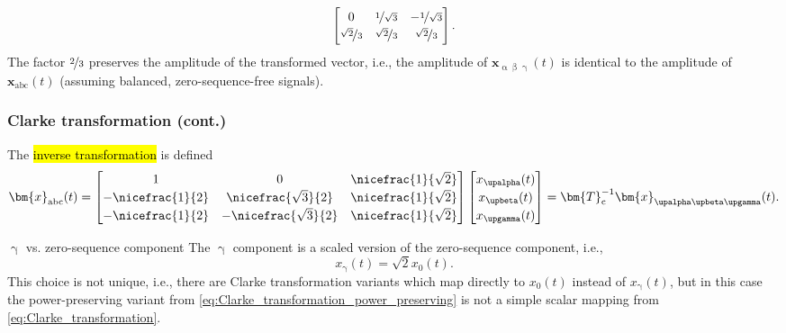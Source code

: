 \begin{frame}
\begin{equation}
\begin{bmatrix}
            0                      & \nicefrac{1}{\sqrt{3}} & -\nicefrac{1}{\sqrt{3}} \\
            \nicefrac{\sqrt{2}}{3} & \nicefrac{\sqrt{2}}{3} & \nicefrac{\sqrt{2}}{3}
        \end{bmatrix}.
    \end{equation}\pause
    The factor $\nicefrac{2}{3}$ preserves the amplitude of the transformed vector, i.e., the amplitude of $\bm{x}_\mathrm{\upalpha \upbeta \upgamma}(t)$ is identical to the amplitude of $\bm{x}_\mathrm{abc}(t)$ (assuming balanced,  zero-sequence-free signals).
\end{frame}

\begin{frame}
    \frametitle{Clarke transformation (cont.)}
    The \hl{inverse transformation} is defined
    \begin{equation}
        \renewcommand{\arraystretch}{1.2}
        \bm{x}_\mathrm{abc}(t)  = \begin{bmatrix}
            1                & 0                       & \nicefrac{1}{\sqrt{2}} \\
            -\nicefrac{1}{2} & \nicefrac{\sqrt{3}}{2}  & \nicefrac{1}{\sqrt{2}} \\
            -\nicefrac{1}{2} & -\nicefrac{\sqrt{3}}{2} & \nicefrac{1}{\sqrt{2}}
        \end{bmatrix} \begin{bmatrix} x_\upalpha(t) \\ x_\upbeta(t) \\ x_\upgamma(t)\end{bmatrix} = \bm{T}_\mathrm{c}^{-1} \bm{x}_{\upalpha \upbeta \upgamma}(t).
    \end{equation}\pause
    \begin{varblock}{$\upgamma$ vs. zero-sequence component}
        The $\upgamma$ component is a scaled version of the zero-sequence component, i.e., $$x_\upgamma(t) = \sqrt{2} x_0(t).$$
        This choice is not unique, i.e., there are Clarke transformation variants which map directly to $x_0(t)$ instead of $x_\upgamma(t)$, but in this case the power-preserving variant from \eqref{eq:Clarke_transformation_power_preserving} is not a simple scalar mapping from \eqref{eq:Clarke_transformation}.
    \end{varblock}
\end{frame}

